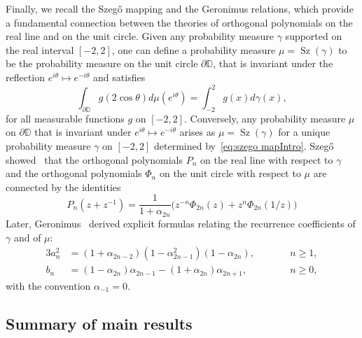 \documentclass[reqno,centertags,11pt,draft]{amsart}
\newcommand{\T}{\mathbb{\partial\mathbb{D}}}
\begin{document}
Finally, we recall the Szeg\H{o} mapping and the Geronimus relations, which provide a fundamental connection between the theories of orthogonal polynomials on the real line and on the unit circle. Given any probability measure $\gamma$ supported on the real interval $[-2,2]$, one can define a  probability measure $\mu=\operatorname{Sz}(\gamma)$ to be the probability measure on the unit circle $\T$, that is invariant under the reflection $e^{i\theta}\mapsto e^{-i\theta}$ and satisfies
\begin{equation}\label{eq:szego mapIntro}
    \int_{\T} g(2\cos\theta) d\mu(e^{i\theta}) = \int_{-2}^2 g(x) d\gamma(x),
\end{equation}
for all measurable functions $g$ on $[-2,2]$. Conversely,  any probability measure $\mu$ on $\T$ that is invariant under $e^{i\theta}\mapsto e^{-i\theta}$ arises as   $\mu=\operatorname{Sz}(\gamma)$ for a unique probability measure $\gamma$ on $[-2,2]$  determined by~\eqref{eq:szego mapIntro}. Szeg\H{o} showed~\cite{Szego} that the orthogonal polynomials $P_n$ on the real line with respect to $\gamma$ and the orthogonal polynomials $\Phi_n$ on the unit circle with respect to $\mu$ are connected by the identities
\begin{equation}
     P_n(z+z^{-1}) = \frac{1}{1+\alpha_{2n}} \big( z^{-n} \Phi_{2n}(z) + z^{n} \Phi_{2n}(1/z) \big) 
\end{equation}
Later, Geronimus~\cite{GeronimusRelations,GeronimusBook} derived explicit formulas relating the recurrence coefficients of $\gamma$ and  of $\mu$:
\begin{alignat}{3}
\label{eq:GerIntro1}
    a^2_n &  = (1+\alpha_{2n-2})(1-\alpha_{2n-1}^2)(1-\alpha_{2n}),
    \qquad && n\ge 1,
    \\
\label{eq:GerIntro2}
    b_n & =(1-\alpha_{2n})\alpha_{2n-1} - (1+\alpha_{2n})\alpha_{2n+1}, \qquad && n\ge 0,
\end{alignat}
with the convention $\alpha_{-1} = 0$. %


\subsection{Summary of main results}\label{ss:main}
\hfill\\
\end{document}
